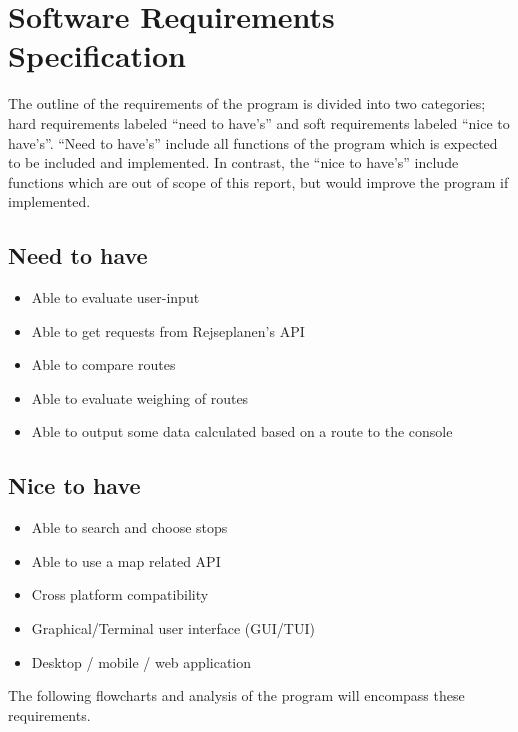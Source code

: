 \section{Software Requirements Specification}\label{sec:software-requirements-specification}

The outline of the requirements of the program is divided into two categories; hard requirements labeled ``need to
have's'' and soft requirements labeled ``nice to have's''.
``Need to have's'' include all functions of the program which is expected to be included and implemented.
In contrast, the ``nice to have's'' include functions which are out of scope of this report, but would improve the
program if implemented.

\subsection{Need to have}\label{subsec:need-to-have}

\begin{itemize}
    \item Able to evaluate user-input
    \item Able to get requests from Rejseplanen’s API
    \item Able to compare routes
    \item Able to evaluate weighing of routes
    \item Able to output some data calculated based on a route to the console
\end{itemize}

\subsection{Nice to have}\label{subsec:nice-to-have}

\begin{itemize}
    \item Able to search and choose stops
    \item Able to use a map related API
    \item Cross platform compatibility
    \item Graphical/Terminal user interface (GUI/TUI)
    \item Desktop / mobile / web application
\end{itemize}

The following flowcharts and analysis of the program will encompass these requirements.
